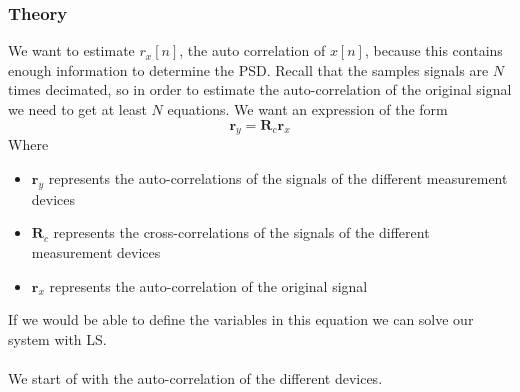 \documentclass[oneside, a4paper, openany]{memoir}
\begin{document}
\subsubsection{Theory}
We want to estimate $r_x[n]$, the auto correlation of $x[n]$, because this contains enough information to determine the PSD.
Recall that the samples signals are $N$ times decimated, so in order to estimate the auto-correlation of the original signal we need to get at least $N$ equations. 
We want an expression of the form
$$
\mathbf{r}_y = \mathbf{R}_c\mathbf{r}_x
$$ 
Where
\begin{itemize}
\item $\mathbf{r}_y$ represents the auto-correlations of the signals of the different measurement devices
\item $\mathbf{R}_c$ represents the cross-correlations of the signals of the different measurement devices 
\item $\mathbf{r}_x$ represents the auto-correlation of the original signal
\end{itemize}
If we would be able to define the variables in this equation we can solve our system with LS.\\
\\
We start of with the auto-correlation of the different devices.
\end{document}
